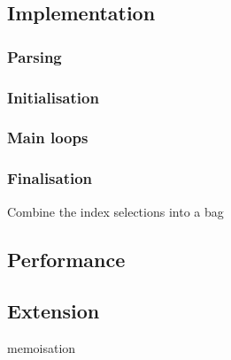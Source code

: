 \subsection{Implementation}
\subsubsection{Parsing}
\subsubsection{Initialisation}
\subsubsection{Main loops}
\subsubsection{Finalisation}
Combine the index selections into a bag

\subsection{Performance}

\subsection{Extension}
memoisation

